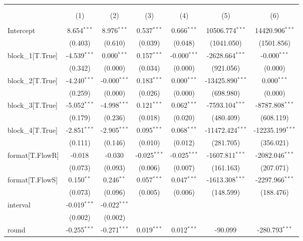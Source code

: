\begin{table}[!htbp] \centering
\begin{tabular}{@{\extracolsep{5pt}}lcccccc}
\\[-1.8ex]\hline
\hline \\[-1.8ex]
\\[-1.8ex] & (1) & (2) & (3) & (4) & (5) & (6) \\
\hline \\[-1.8ex]
 Intercept & 8.654$^{***}$ & 8.976$^{***}$ & 0.537$^{***}$ & 0.666$^{***}$ & 10506.774$^{***}$ & 14420.906$^{***}$ \\
& (0.403) & (0.610) & (0.039) & (0.048) & (1041.050) & (1501.856) \\
 block_1[T.True] & -4.539$^{***}$ & 0.000$^{***}$ & 0.157$^{***}$ & -0.000$^{***}$ & -2628.664$^{***}$ & -0.000$^{***}$ \\
& (0.342) & (0.000) & (0.034) & (0.000) & (921.056) & (0.000) \\
 block_2[T.True] & -4.240$^{***}$ & -0.000$^{***}$ & 0.183$^{***}$ & 0.000$^{***}$ & -13425.890$^{***}$ & 0.000$^{***}$ \\
& (0.259) & (0.000) & (0.026) & (0.000) & (698.980) & (0.000) \\
 block_3[T.True] & -5.052$^{***}$ & -4.998$^{***}$ & 0.121$^{***}$ & 0.062$^{***}$ & -7593.104$^{***}$ & -8787.808$^{***}$ \\
& (0.179) & (0.236) & (0.018) & (0.020) & (480.409) & (608.119) \\
 block_4[T.True] & -2.851$^{***}$ & -2.905$^{***}$ & 0.095$^{***}$ & 0.068$^{***}$ & -11472.424$^{***}$ & -12235.199$^{***}$ \\
& (0.111) & (0.146) & (0.010) & (0.012) & (281.705) & (356.021) \\
 format[T.FlowR] & -0.018$^{}$ & -0.030$^{}$ & -0.025$^{***}$ & -0.025$^{***}$ & -1607.811$^{***}$ & -2082.046$^{***}$ \\
& (0.073) & (0.093) & (0.006) & (0.007) & (161.163) & (207.071) \\
 format[T.FlowS] & 0.150$^{**}$ & 0.246$^{**}$ & 0.057$^{***}$ & 0.047$^{***}$ & -1613.308$^{***}$ & -2297.966$^{***}$ \\
& (0.073) & (0.096) & (0.005) & (0.006) & (148.599) & (188.476) \\
 interval & -0.019$^{***}$ & -0.022$^{***}$ & & & & \\
& (0.002) & (0.002) & & & & \\
 round & -0.255$^{***}$ & -0.271$^{***}$ & 0.019$^{***}$ & 0.012$^{***}$ & -90.099$^{}$ & -280.793$^{***}$ \\

\end{tabular}
\end{table}

